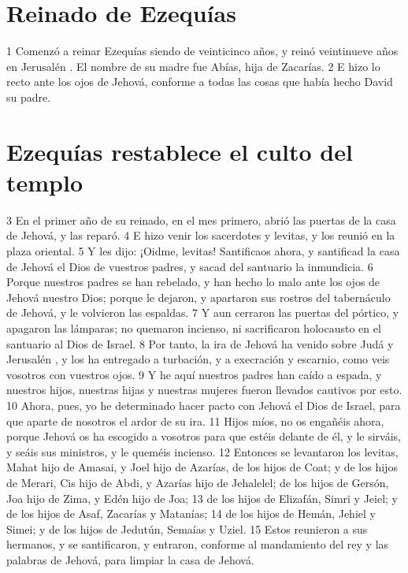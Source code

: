\section*{Reinado de Ezequías}

 

1 Comenzó a reinar Ezequías siendo de veinticinco años, y reinó veintinueve años en Jerusalén . El nombre de su madre fue Abías, hija de Zacarías.
2 E hizo lo recto ante los ojos de Jehová, conforme a todas las cosas que había hecho David su padre.
\section*{Ezequías restablece el culto del templo}

3 En el primer año de su reinado, en el mes primero, abrió las puertas de la casa de Jehová, y las reparó.
4 E hizo venir los sacerdotes y levitas, y los reunió en la plaza oriental.
5 Y les dijo: ¡Oidme, levitas! Santificaos ahora, y santificad la casa de Jehová el Dios de vuestros padres, y sacad del santuario la inmundicia.
6 Porque nuestros padres se han rebelado, y han hecho lo malo ante los ojos de Jehová nuestro Dios; porque le dejaron, y apartaron sus rostros del tabernáculo de Jehová, y le volvieron las espaldas.
7 Y aun cerraron las puertas del pórtico, y apagaron las lámparas; no quemaron incienso, ni sacrificaron holocausto en el santuario al Dios de Israel.
8 Por tanto, la ira de Jehová ha venido sobre Judá y Jerusalén , y los ha entregado a turbación, y a execración y escarnio, como veis vosotros con vuestros ojos. 
9 Y he aquí nuestros padres han caído a espada, y nuestros hijos, nuestras hijas y nuestras mujeres fueron llevados cautivos por esto.
10 Ahora, pues, yo he determinado hacer pacto con Jehová el Dios de Israel, para que aparte de nosotros el ardor de su ira.
11 Hijos míos, no os engañéis ahora, porque Jehová os ha escogido a vosotros para que estéis delante de él, y le sirváis, y seáis sus ministros, y le queméis incienso.
12 Entonces se levantaron los levitas, Mahat hijo de Amasai, y Joel hijo de Azarías, de los hijos de Coat; y de los hijos de Merari, Cis hijo de Abdi, y Azarías hijo de Jehalelel; de los hijos de Gersón, Joa hijo de Zima, y Edén hijo de Joa;
13 de los hijos de Elizafán, Simri y Jeiel; y de los hijos de Asaf, Zacarías y Matanías;
14 de  los hijos de Hemán, Jehiel y Simei; y de los hijos de Jedutún, Semaías y Uziel.
15 Estos reunieron a sus hermanos, y se santificaron, y entraron, conforme al mandamiento del rey y las palabras de Jehová, para limpiar la casa de Jehová.
